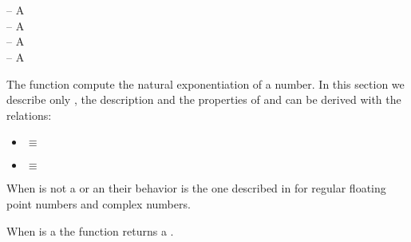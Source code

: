 \documentclass[../Exponentials-Logarithms-Trigonometry.tex]{subfiles}
\begin{document}

    \DSyntax{}

      \RArrow {}\\
       \RArrow {}\\
      \RArrow {}

    \DArgsNValues{}

     -- A \\
     -- A \\
     -- A \\
     -- A 

    \DDescription{}

    The function  compute the natural exponentiation of a number. In
    this section we describe only , the description and the properties
    of  and  can be derived with the relations:
    \begin{itemize}
        \item {}  \code{)} $\equiv$ 
        \code{)}  \code{))}
        \item {} \code{)} $\equiv$  
        \code{))}
    \end{itemize}


    When  is not a  or an
     their behavior is the one described in
    \cite{1996:ANSIHyperSpec} for regular floating point numbers and complex
    numbers.

    \noindent
    When  is a  the function  returns a
    .
\end{document}
